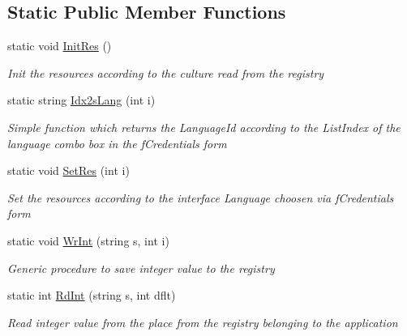 \subsection*{Static Public Member Functions}
\begin{DoxyCompactItemize}
\item 
static void \hyperlink{class_e_u_cases_1_1_e_u_links_checker_word_add_in_1_1_e_u_links_checker_add_in_a99a10a7ec8ddedb6c65289d31ef429a9}{Init\+Res} ()
\begin{DoxyCompactList}\small\item\em Init the resources according to the culture read from the registry \end{DoxyCompactList}\item 
static string \hyperlink{class_e_u_cases_1_1_e_u_links_checker_word_add_in_1_1_e_u_links_checker_add_in_a7a78b541c8ba8652e16961d8261790a1}{Idx2s\+Lang} (int i)
\begin{DoxyCompactList}\small\item\em Simple function which returns the Language\+Id according to the List\+Index of the language combo box in the f\+Credentials form \end{DoxyCompactList}\item 
static void \hyperlink{class_e_u_cases_1_1_e_u_links_checker_word_add_in_1_1_e_u_links_checker_add_in_af5d2b64d0e3b495b09cec99a25fb82ac}{Set\+Res} (int i)
\begin{DoxyCompactList}\small\item\em Set the resources according to the interface Language choosen via f\+Credentials form \end{DoxyCompactList}\item 
static void \hyperlink{class_e_u_cases_1_1_e_u_links_checker_word_add_in_1_1_e_u_links_checker_add_in_a9cd68615aa915f07ded94cf8b81490e9}{Wr\+Int} (string s, int i)
\begin{DoxyCompactList}\small\item\em Generic procedure to save integer value to the registry \end{DoxyCompactList}\item 
static int \hyperlink{class_e_u_cases_1_1_e_u_links_checker_word_add_in_1_1_e_u_links_checker_add_in_ad34d4de9345583c42008542f651c5072}{Rd\+Int} (string s, int dflt)
\begin{DoxyCompactList}\small\item\em Read integer value from the place from the registry belonging to the application \end{DoxyCompactList}\item 

\end{DoxyCompactItemize}

